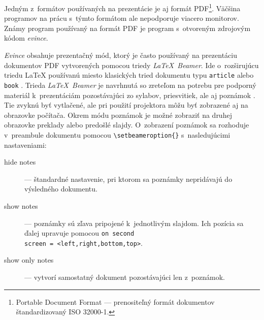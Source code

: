 \documentclass[12pt,oneside,final]{fithesis2}
\begin{document}
Jedným z~formátov používaných na prezentácie je aj formát PDF\footnote{Portable Document Format --- prenositeľný formát dokumentov štandardizovaný ISO 32000-1.}. Väčšina programov na prácu s~týmto formátom ale nepodporuje viacero monitorov. Známy program používaný na formát PDF je program s~otvoreným zdrojovým kódom \emph{evince}.

\emph{Evince} obsahuje prezentačný mód, ktorý je často používaný na prezentáciu dokumentov PDF vytvorených pomocou triedy \emph{\LaTeX~Beamer}. Ide o~rozširujúcu triedu \LaTeX{} používanú miesto klasických tried dokumentu typu \texttt{article} alebo \texttt{book} \cite{abclatex}. Trieda \emph{\LaTeX~Beamer} je navrhnutá so zreteľom na potrebu pre podporný materiál k~prezentáciám pozostávajúci zo sylabov, priesvitiek, ale aj poznámok \cite{beamer}. Tie zvyknú byť vytlačené, ale pri použití projektora môžu byť zobrazené aj na obrazovke počítača. Okrem módu poznámok je možné zobraziť na druhej obrazovke preklady alebo predošlé slajdy. O~zobrazení poznámok sa rozhoduje v~preambule dokumentu pomocou \verb|\setbeameroption{}| s~nasledujúcimi nastaveniami:
\begin{description}
\item[hide notes] --- štandardné nastavenie, pri ktorom sa poznámky nepridávajú do výsledného dokumentu.
\item[show notes] --- poznámky sú zľava pripojené k~jednotlivým slajdom. Ich pozícia sa ďalej upravuje pomocou \texttt{on second \\ screen = <left,right,bottom,top>}.
\item[show only notes] --- vytvorí samostatný dokument pozostávajúci len z~poznámok.
\end{description}
\end{document}
